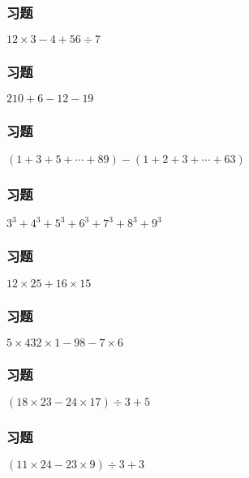 \begin{frame}
    \frametitle{习题\theframecounter}
    \vspace*{-3cm}
    \centering\textit{\Large $12\times 3 - 4 + 56\div 7$}
\end{frame}


\begin{frame}
    \frametitle{习题\theframecounter}
    \vspace*{-3cm}
    \centering\textit{\Large $210 + 6-12 - 19$}
\end{frame}


\begin{frame}
    \frametitle{习题\theframecounter} 
    \vspace*{-3cm}   
    \centering\textit{\Large $(1+3+5+\cdots + 89) - (1+2+3+\cdots + 63)$}
\end{frame}



\begin{frame}
    \frametitle{习题\theframecounter}  
    \vspace*{-3cm}  
    \centering\textit{\Large $3^3 + 4^3 + 5^3 + 6^3 + 7^3 + 8^3 + 9^3$}
\end{frame}


\begin{frame}
    \frametitle{习题\theframecounter} 
    \vspace*{-3cm}   
    \centering\textit{\Large $12\times 25 + 16\times 15$}
\end{frame}



\begin{frame}
    \frametitle{习题\theframecounter}
    \vspace*{-3cm}
    \centering\textit{\Large $5\times 432\times 1 - 98 - 7\times 6$}
\end{frame}

\begin{frame}
    \frametitle{习题\theframecounter}
    \vspace*{-3cm}
    \centering\textit{\Large $(18\times 23 - 24\times 17)\div 3 + 5$}
\end{frame}


\begin{frame}
    \frametitle{习题\theframecounter}
    \vspace*{-3cm}   
    \centering\textit{\Large $(11\times 24 - 23\times 9)\div 3 + 3$}
\end{frame}



